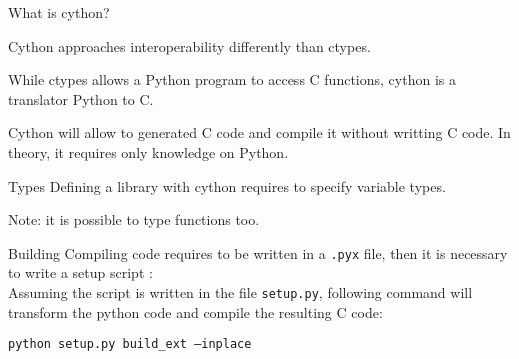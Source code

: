 \begin{frame}{What is cython?}

    Cython approaches interoperability differently than ctypes.

    While \alert{ctypes} allows a Python program to access C functions, \alert{cython} is a translator Python to C.

    Cython will allow to generated C code and compile it without writting C code. In theory, it requires only knowledge on Python.

\end{frame}

\begin{frame}{Types}
    Defining a library with cython requires to specify variable types.
    
    Note: it is possible to type functions too.
    
\end{frame}

\begin{frame}{Building}
    Compiling code requires to be written in a \texttt{.pyx} file, then it is necessary to write a setup script :
    \\

    Assuming the script is written in the file \texttt{setup.py}, following command will transform the python code and compile the resulting C code:

    \texttt{python setup.py build\_ext --inplace}
    

\end{frame}